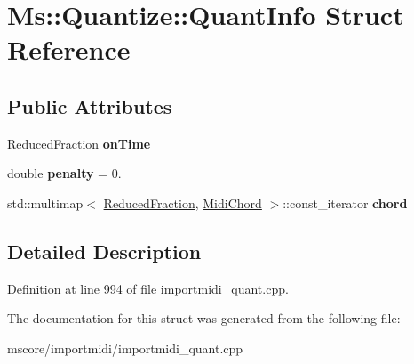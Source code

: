 \hypertarget{struct_ms_1_1_quantize_1_1_quant_info}{}\section{Ms\+:\+:Quantize\+:\+:Quant\+Info Struct Reference}
\label{struct_ms_1_1_quantize_1_1_quant_info}
\subsection*{Public Attributes}
\begin{DoxyCompactItemize}
\item 
\mbox{\label{struct_ms_1_1_quantize_1_1_quant_info_a45bd67a669f45d4a36c60c0f8f661e37}} 
\hyperlink{class_ms_1_1_reduced_fraction}{Reduced\+Fraction} {\bfseries on\+Time}
\item 
\mbox{\label{struct_ms_1_1_quantize_1_1_quant_info_ab79dc0ce99679dff48c30793de92134e}} 
double {\bfseries penalty} = 0.
\item 
\mbox{\label{struct_ms_1_1_quantize_1_1_quant_info_ae18090a160036489e68e0ccaa210cb0c}} 
std\+::multimap$<$ \hyperlink{class_ms_1_1_reduced_fraction}{Reduced\+Fraction}, \hyperlink{class_ms_1_1_midi_chord}{Midi\+Chord} $>$\+::const\+\_\+iterator {\bfseries chord}
\end{DoxyCompactItemize}


\subsection{Detailed Description}


Definition at line 994 of file importmidi\+\_\+quant.\+cpp.



The documentation for this struct was generated from the following file\+:\begin{DoxyCompactItemize}
\item 
mscore/importmidi/importmidi\+\_\+quant.\+cpp\end{DoxyCompactItemize}
